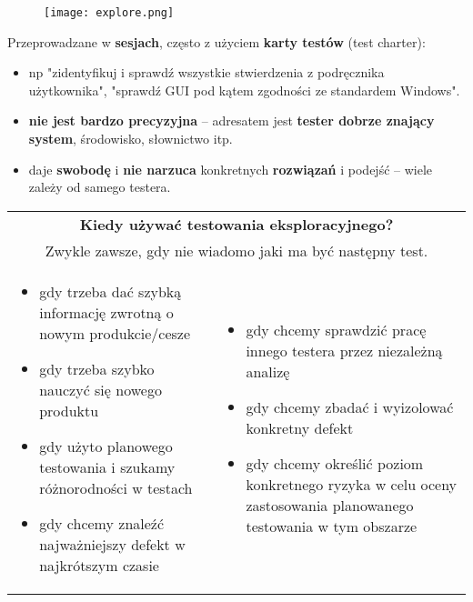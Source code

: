 \documentclass[../main.tex]{subfiles}
\begin{document}
    \begin{figure}[H]
        \texttt{[image: explore.png]}
    \end{figure}

    Przeprowadzane w \textbf{sesjach}, często z użyciem \textbf{karty testów} (test charter):
    \begin{itemize}
        \item np "zidentyfikuj i sprawdź
        wszystkie stwierdzenia z podręcznika użytkownika", "sprawdź GUI pod kątem zgodności ze standardem Windows".
        \item \textbf{nie jest bardzo precyzyjna} – adresatem jest \textbf{tester dobrze znający system}, środowisko,
        słownictwo itp.
        \item daje \textbf{swobodę} i \textbf{nie narzuca} konkretnych \textbf{rozwiązań} i podejść – wiele zależy od samego testera.
    \end{itemize}

    \begin{table}[H]
        \begin{center}
            \begin{tabular}{p{8cm} p{8cm}}
                \multicolumn{2}{c}{\textbf{Kiedy używać testowania eksploracyjnego?}} \\
                \multicolumn{2}{c}{Zwykle zawsze, gdy nie wiadomo jaki ma być następny test.} \\
                \begin{itemize}
                    \item gdy trzeba dać szybką informację zwrotną o nowym produkcie/cesze
                    \item gdy trzeba szybko nauczyć się nowego produktu
                    \item gdy użyto planowego testowania i szukamy różnorodności w testach
                    \item gdy chcemy znaleźć najważniejszy defekt w najkrótszym czasie
                \end{itemize}
                &
                \begin{itemize}
                    \item gdy chcemy sprawdzić pracę innego testera przez niezależną analizę
                    \item gdy chcemy zbadać i wyizolować konkretny defekt
                    \item gdy chcemy określić poziom konkretnego ryzyka w celu oceny zastosowania planowanego testowania w tym obszarze
                \end{itemize}
            \end{tabular}
        \end{center}
    \end{table}
\end{document}
